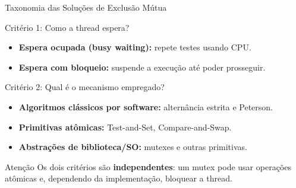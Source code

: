 \documentclass[aspectratio=169,11pt]{beamer}
\begin{document}
\begin{frame}{Taxonomia das Soluções de Exclusão Mútua}
\small
\begin{block}{Critério 1: Como a thread espera?}
\begin{itemize}
\item \textbf{Espera ocupada (busy waiting):} repete testes usando CPU.
\item \textbf{Espera com bloqueio:} suspende a execução até poder prosseguir.
\end{itemize}
\end{block}
\vspace{0.1cm}
\begin{block}{Critério 2: Qual é o mecanismo empregado?}
\begin{itemize}
\item \textbf{Algoritmos clássicos por software:} alternância estrita e Peterson.
\item \textbf{Primitivas atômicas:} Test-and-Set, Compare-and-Swap.
\item \textbf{Abstrações de biblioteca/SO:} mutexes e outras primitivas.
\end{itemize}
\end{block}
\begin{alertblock}{Atenção}
Os dois critérios são \textbf{independentes}: um mutex pode usar
operações atômicas e, dependendo da implementação, bloquear a thread.
\end{alertblock}
\end{frame}


\end{document}
